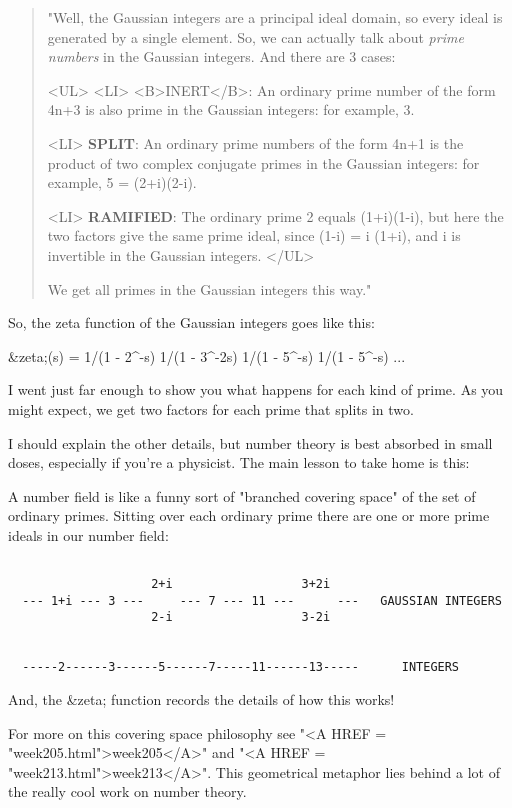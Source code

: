 \begin{quote}
"Well, the Gaussian integers are a principal ideal domain, so every 
ideal is generated by a single element.  So, we can actually talk 
about \emph{prime numbers} in the Gaussian integers.  And there are 3 cases:

<UL>
<LI>
<B>INERT</B>: An ordinary prime number of the form 4n+3 is also prime 
 in the Gaussian integers: for example, 3.

<LI>
\textbf{SPLIT}: An ordinary prime numbers of the form 4n+1 is the product 
 of two complex conjugate primes in the Gaussian integers: for 
 example, 5 = (2+i)(2-i).

<LI>
\textbf{RAMIFIED}: The ordinary prime 2 equals (1+i)(1-i), but here the 
 two factors give the same prime ideal, since (1-i) = i (1+i), 
 and i is invertible in the Gaussian integers.
</UL>

We get all primes in the Gaussian integers this way."

\end{quote}
So, the zeta function of the Gaussian integers goes like this:

&zeta;(s) = 1/(1 - 2^{-s})  1/(1 - 3^{-2s})  1/(1 - 5^{-s})  1/(1 - 5^{-s}) ...

I went just far enough to show you what happens for each kind of
prime.  As you might expect, we get two factors for each prime
that splits in two.

I should explain the other details, but number theory is best 
absorbed in small doses, especially if you're a physicist.  The 
main lesson to take home is this:

A number field is like a funny sort of "branched covering space" of 
the set of ordinary primes.  Sitting over each ordinary prime
there are one or more prime ideals in our number field:



\begin{verbatim}

                    2+i                  3+2i
  --- 1+i --- 3 ---     --- 7 --- 11 ---      ---   GAUSSIAN INTEGERS 
                    2-i                  3-2i           


  -----2------3------5------7-----11------13-----      INTEGERS

\end{verbatim}
    
And, the &zeta; function records the details of how this works!

For more on this covering space philosophy see "<A HREF = "week205.html">week205</A>" and "<A HREF = "week213.html">week213</A>".  
This geometrical metaphor lies behind a lot of the really cool work 
on number theory.

